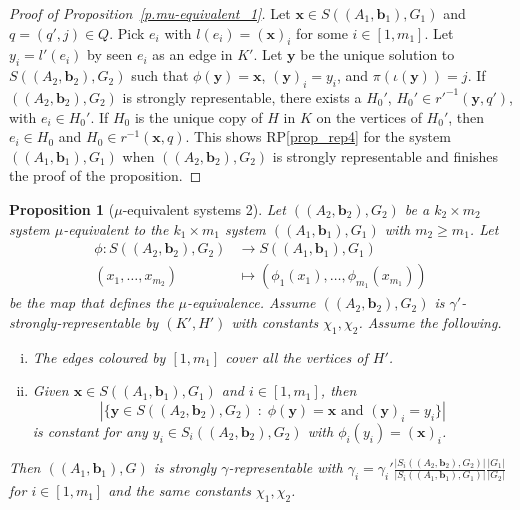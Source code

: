 \documentclass[10pt]{article}
\newtheorem{proposition}[theorem]{Proposition}
\begin{document}
\begin{proof}[Proof of Proposition~\ref{p.mu-equivalent_1}]
	
	Let $\mathbf{x}\in S((A_1,\mathbf{b}_1),G_1)$ and $q=(q',j)\in Q$. Pick $e_i$ with $l(e_i)=(\mathbf{x})_i$ for some $i\in[1,m_1]$. Let $y_i=l'(e_i)$ by seen $e_i$ as an edge in $K'$. Let $\mathbf{y}$ be the unique solution to  $S((A_2,\mathbf{b}_2),G_2)$ such that $\phi(\mathbf{y})=\mathbf{x}$, $(\mathbf{y})_i=y_i$, and $\pi(\iota(\mathbf{y}))=j$. If $((A_2,\mathbf{b}_2),G_2)$ is strongly representable, there exists a $H_0'$, $H_0'\in r'^{-1}(\mathbf{y},q')$, with $e_i\in H_0'$. If $H_0$ is the unique copy of $H$ in $K$ on the vertices of $H_0'$, then $e_i\in H_0$ and $H_0\in r^{-1}(\mathbf{x},q)$. This shows RP\ref{prop_rep4} for the system $((A_1,\mathbf{b}_1),G_1)$ when $((A_2,\mathbf{b}_2),G_2)$ is strongly representable and finishes the proof of the proposition.
\end{proof}





\begin{proposition}[$\mu$-equivalent systems 2] \label{p.mu-equivalent_2}
Let $((A_2,\mathbf{b}_2),G_2)$ be a $k_2\times m_2$ system $\mu$-equivalent to the $k_1\times m_1$ system $((A_1,\mathbf{b}_1),G_1)$ with $m_2\geq m_1$. Let
	\begin{align}
		\phi:S((A_2,\mathbf{b}_2),G_2)&\longrightarrow S((A_1,\mathbf{b}_1),G_1) \nonumber \\
		(x_1,\ldots,x_{m_2}) &\longmapsto  \left(\phi_1(x_{1}),\ldots,\phi_{m_1}(x_{m_1})\right) \nonumber
	\end{align}
	be the map that defines the $\mu$-equivalence.
	Assume $((A_2,\mathbf{b}_2),G_2)$ is 
$\gamma'$-strongly-representable
	by $(K',H')$ with constants $\chi_1,\chi_2$. Assume the following.
 \begin{enumerate}[(i)]
 \item \label{h.1} The edges coloured by $[1,m_1]$ cover all the vertices of $H'$.
\item \label{h.2} Given $\mathbf{x}\in S((A_1,\mathbf{b}_1),G_1)$ and $i\in[1,m_1]$,
then 
\begin{displaymath}
	\left\vert \{\mathbf{y}\in S((A_2,\mathbf{b}_2),G_2)\; : \;  \phi(\mathbf{y})=\mathbf{x} \text{ and }  (\mathbf{y})_i = y_i \}\right|
	\end{displaymath} 
is constant for any $y_i\in S_i((A_2,\mathbf{b}_2),G_2)$ with $\phi_i(y_i)=(\mathbf{x})_i$.
 \end{enumerate} 
Then  $((A_1,\mathbf{b}_1),G)$ is strongly $\gamma$-representable 
with
$\gamma_i=\gamma_i'\frac{|S_i((A_2,\mathbf{b}_2),G_2)|}{|S_i((A_1,\mathbf{b}_1),G_1)|}\frac{|G_1|}{|G_2|}$ for $i\in[1,m_1]$ and the
 same constants $\chi_1,\chi_2$.
\end{proposition}
\end{document}
